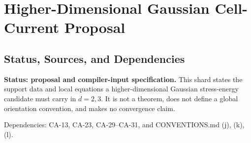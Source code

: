 
\section{Higher-Dimensional Gaussian Cell-Current Proposal}
\label{sec:gaussian-higher-dimensional-cell-currents}

\subsection{Status, Sources, and Dependencies}

\textbf{Status: proposal and compiler-input specification.}  This shard states
the support data and local equations a higher-dimensional Gaussian
stress-energy candidate must carry in \(d=2,3\).  It is not a theorem, does not
define a global orientation convention, and makes no convergence claim.

Dependencies: CA-13, CA-23, CA-29--CA-31, and CONVENTIONS.md (j), (k), (l).

